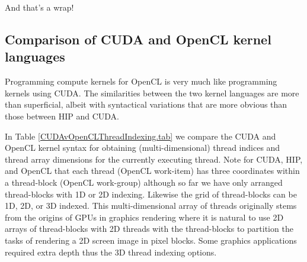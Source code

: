 And that's a wrap! 

\subsection{Comparison of CUDA and OpenCL kernel languages}

Programming compute kernels for OpenCL is very much like programming kernels using CUDA. The similarities between the two kernel languages are more than superficial, albeit with syntactical variations that are more obvious than those between HIP and CUDA. 

In Table \ref{CUDAvOpenCLThreadIndexing.tab} we compare the CUDA and OpenCL kernel syntax for obtaining (multi-dimensional) thread indices and thread array dimensions for the currently executing thread. Note for CUDA, HIP, and OpenCL that each thread (OpenCL work-item) has three coordinates within a thread-block (OpenCL work-group) although so far we have only arranged thread-blocks with 1D or 2D indexing. Likewise the grid of thread-blocks can be 1D, 2D, or 3D indexed. This multi-dimensional array of threads originally stems from the origins of GPUs in graphics rendering where it is natural to use 2D arrays of thread-blocks with 2D threads with the thread-blocks to partition the tasks of rendering a 2D screen image in pixel blocks. Some graphics applications required extra depth thus the 3D thread indexing options.


